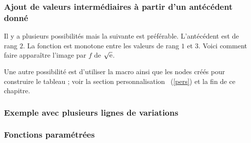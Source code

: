 \subsubsection{Ajout de valeurs intermédiaires à partir d'un antécédent donné}
Il y a plusieurs  possibilités mais la suivante est préférable. L'antécédent est de rang $2$.
 La fonction est monotone entre les valeurs de rang $1$ et $3$. Voici comment faire apparaître l'image par $f$ de $\sqrt{\mathrm{e}}$.

\begin{tkzexample}
\end{tkzexample}

Une autre possibilité est d'utiliser la macro  ainsi que les nodes créés pour construire le tableau ;  voir la section \og personnalisation \fg\ (\ref{pers}) et la fin de ce chapitre.

\subsubsection{Exemple avec plusieurs lignes de variations}
\begin{tkzexample}
\end{tkzexample}


\subsubsection{Fonctions paramétrées}

